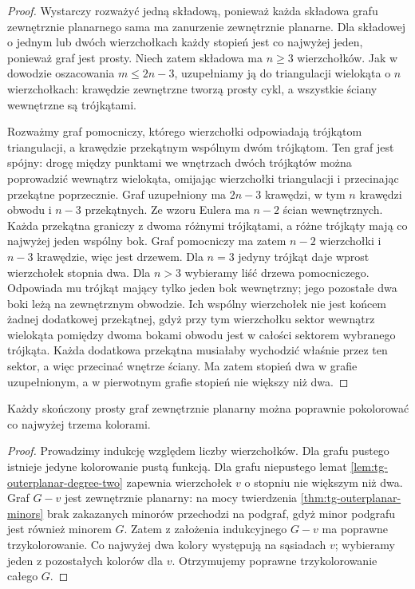 \begin{proof}
Wystarczy rozważyć jedną składową, ponieważ każda
składowa grafu zewnętrznie planarnego sama ma
zanurzenie zewnętrznie planarne. Dla składowej
o jednym lub dwóch wierzchołkach każdy stopień
jest co najwyżej jeden, ponieważ graf jest prosty.
Niech zatem składowa ma $n\ge3$ wierzchołków.
Jak w dowodzie oszacowania $m\le2n-3$,
uzupełniamy ją do triangulacji wielokąta o $n$
wierzchołkach: krawędzie zewnętrzne tworzą prosty
cykl, a wszystkie ściany wewnętrzne są trójkątami.

Rozważmy graf pomocniczy, którego wierzchołki
odpowiadają trójkątom triangulacji, a krawędzie
przekątnym wspólnym dwóm trójkątom.
Ten graf jest spójny: drogę między punktami
we wnętrzach dwóch trójkątów można poprowadzić
wewnątrz wielokąta, omijając wierzchołki triangulacji
i przecinając przekątne poprzecznie.
Graf uzupełniony ma $2n-3$ krawędzi, w tym $n$
krawędzi obwodu i $n-3$ przekątnych. Ze wzoru Eulera
ma $n-2$ ścian wewnętrznych. Każda przekątna graniczy
z dwoma różnymi trójkątami, a różne trójkąty mają
co najwyżej jeden wspólny bok. Graf pomocniczy ma
zatem $n-2$ wierzchołki i $n-3$ krawędzie, więc jest drzewem. Dla $n=3$ jedyny trójkąt
daje wprost wierzchołek stopnia dwa.
Dla $n>3$ wybieramy liść drzewa pomocniczego.
Odpowiada mu trójkąt mający tylko jeden bok
wewnętrzny; jego pozostałe dwa boki leżą na
zewnętrznym obwodzie. Ich wspólny wierzchołek
nie jest końcem żadnej dodatkowej przekątnej,
gdyż przy tym wierzchołku sektor wewnątrz wielokąta
pomiędzy dwoma bokami obwodu jest w całości sektorem
wybranego trójkąta. Każda dodatkowa przekątna musiałaby
wychodzić właśnie przez ten sektor, a więc przecinać
wnętrze ściany.
Ma zatem stopień dwa w grafie uzupełnionym,
a w pierwotnym grafie stopień nie większy niż dwa.
\end{proof}

\begin{twierdzenie}
\label{thm:tg-outerplanar-three-color}
Każdy skończony prosty graf zewnętrznie planarny
można poprawnie pokolorować co najwyżej
trzema kolorami.
\end{twierdzenie}

\begin{proof}
Prowadzimy indukcję względem liczby wierzchołków.
Dla grafu pustego istnieje jedyne kolorowanie pustą
funkcją. Dla grafu niepustego lemat
\ref{lem:tg-outerplanar-degree-two} zapewnia
wierzchołek $v$ o stopniu nie większym niż dwa.
Graf $G-v$ jest zewnętrznie planarny: na mocy
twierdzenia \ref{thm:tg-outerplanar-minors}
brak zakazanych minorów przechodzi na podgraf,
gdyż minor podgrafu jest również minorem $G$.
Zatem z założenia indukcyjnego $G-v$ ma poprawne
trzykolorowanie. Co najwyżej dwa kolory
występują na sąsiadach $v$; wybieramy
jeden z pozostałych kolorów dla $v$.
Otrzymujemy poprawne trzykolorowanie całego $G$.
\end{proof}



